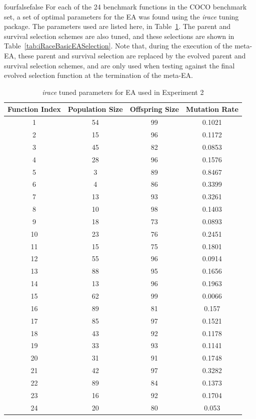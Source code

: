 \documentclass[times,12pt,titlepage]{mstogs}
\begin{document}
\begin{ThesisAppendix}{four}{false}{false}
For each of the 24 benchmark functions in the COCO benchmark set, a set of optimal parameters for the EA was found using the \textit{irace} tuning package. The parameters used are listed here, in Table~\ref{tab:iRaceBasicEAParams}. The parent and survival selection schemes are also tuned, and these selections are shown in Table~\ref{tab:iRaceBasicEASelection}. Note that, during the execution of the meta-EA, these parent and survival selection are replaced by the evolved parent and survival selection schemes, and are only used when testing against the final evolved selection function at the termination of the meta-EA. 

\begin{table}
\centering
  \caption{\textit{irace} tuned parameters for EA used in Experiment 2}
  \label{tab:iRaceBasicEAParams}
  \begin{tabular}{cccc}
    \toprule
    Function Index & Population Size & Offspring Size & Mutation Rate\\
    \midrule
	1 & 54 & 99 & 0.1021\\
	\hline
	2 & 15 & 96 & 0.1172\\
	\hline
	3 & 45 & 82 & 0.0853\\
	\hline
	4 & 28 & 96 & 0.1576\\
	\hline
	5 & 3 & 89 & 0.8467\\
	\hline
	6 & 4 & 86 & 0.3399\\
	\hline
	7 & 13 & 93 & 0.3261\\
	\hline
	8 & 10 & 98 & 0.1403\\
	\hline
	9 & 18 & 73 & 0.0893\\
	\hline
	10 & 23 & 76 & 0.2451\\
	\hline
	11 & 15 & 75 & 0.1801\\
	\hline
	12 & 55 & 96 & 0.0914\\
	\hline
	13 & 88 & 95 & 0.1656\\
	\hline
	14 & 13 & 96 & 0.1963\\
	\hline
	15 & 62 & 99 & 0.0066\\
	\hline
	16 & 89 & 81 & 0.157\\
	\hline
	17 & 85 & 97 & 0.1521\\
	\hline
	18 & 43 & 92 & 0.1178\\
	\hline
	19 & 33 & 93 & 0.1141\\
	\hline
	20 & 31 & 91 & 0.1748\\
	\hline
	21 & 42 & 97 & 0.3282\\
	\hline
	22 & 89 & 84 & 0.1373\\
	\hline
	23 & 16 & 92 & 0.1704\\
	\hline
	24 & 20 & 80 & 0.053\\              
		

\end{tabular}
\end{table}
\end{ThesisAppendix}
\end{document}
